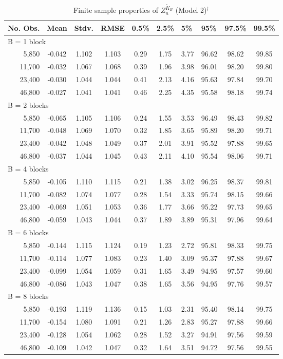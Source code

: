 \documentclass[11pt]{article}
\numberwithin{equation}{section}
\theoremstyle{plain}
\theoremstyle{remark}
\begin{document}
\begin{table}[]
\centering
\caption{Finite sample properties of $Z_n^{\tilde{K}_B}$ (Model 2)$^\dag$} 
\label{stdRK}
\begin{tabular}{@{}rccccccccc@{}}
\toprule
\toprule
\multicolumn{1}{l}{No. Obs.} & \multicolumn{1}{l}{Mean} & \multicolumn{1}{l}{Stdv.} & \multicolumn{1}{l}{RMSE} & \multicolumn{1}{l}{0.5\%} & \multicolumn{1}{l}{2.5\%} & \multicolumn{1}{l}{5\%} & \multicolumn{1}{l}{95\%} & \multicolumn{1}{l}{97.5\%} & \multicolumn{1}{l}{99.5\%} \\ \toprule
\multicolumn{10}{l}{B = 1 block} \\
5,850 & -0.042&1.102&1.103&0.29&1.75&3.77&96.62&98.62&99.85\\
11,700 & -0.032&1.067&1.068&0.39&1.96&3.98&96.01&98.20&99.80\\
23,400 & -0.030&1.044&1.044&0.41&2.13&4.16&95.63&97.84&99.70\\
46,800 &  -0.027&1.041&1.041&0.46&2.25&4.35&95.58&98.18&99.74\\
\multicolumn{10}{l}{B = 2 blocks} \\
5,850 & -0.065&1.105&1.106&0.24&1.55&3.53&96.49&98.43&99.82\\
11,700 & -0.048&1.069&1.070&0.32&1.85&3.65&95.89&98.20&99.71\\
23,400 &  -0.042&1.048&1.049&0.37&2.01&3.91&95.52&97.88&99.65\\
46,800 &  -0.037&1.044&1.045&0.43&2.11&4.10&95.54&98.06&99.71\\
\multicolumn{10}{l}{B = 4 blocks} \\
5,850 & -0.105&1.110&1.115&0.21&1.38&3.02&96.25&98.37&99.81\\
11,700 & -0.082&1.074&1.077&0.28&1.54&3.33&95.74&98.15&99.66\\
23,400 &  -0.069&1.051&1.053&0.36&1.77&3.66&95.22&97.73&99.65\\
46,800 & -0.059&1.043&1.044&0.37&1.89&3.89&95.31&97.96&99.64\\
\multicolumn{10}{l}{B = 6 blocks} \\
5,850 & -0.144&1.115&1.124&0.19&1.23&2.72&95.81&98.33&99.75\\
11,700 & -0.114&1.077&1.083&0.23&1.40&3.09&95.37&97.88&99.67\\
23,400 & -0.099&1.054&1.059&0.31&1.65&3.49&94.95&97.57&99.60\\
46,800 & -0.086&1.043&1.047&0.38&1.65&3.56&94.95&97.76&99.57\\
\multicolumn{10}{l}{B = 8 blocks} \\
5,850 &-0.193&1.119&1.136&0.15&1.03&2.31&95.40&98.14&99.75\\
11,700 & -0.154&1.080&1.091&0.21&1.26&2.83&95.27&97.88&99.66\\
23,400 & -0.128&1.054&1.062&0.28&1.52&3.27&94.91&97.56&99.59\\
46,800 &-0.109&1.042&1.047&0.32&1.64&3.51&94.72&97.56&99.55\\
\bottomrule


\end{tabular}
\end{table}
\end{document}
